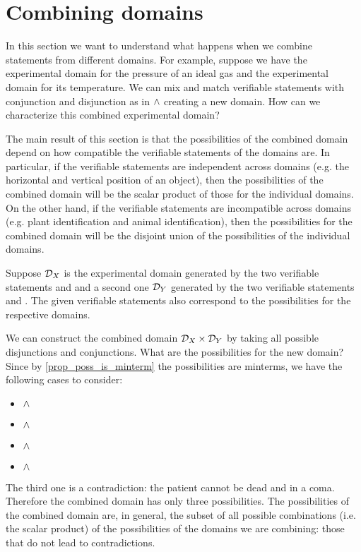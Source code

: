 \documentclass[11pt,letterpaper,fleqn]{memoir} %
\begin{document}
\section{Combining domains}

In this section we want to understand what happens when we combine statements from different domains. For example, suppose we have the experimental domain for the pressure of an ideal gas and the experimental domain for its temperature. We can mix and match verifiable statements with conjunction and disjunction as in $\wedge$ creating a new domain. How can we characterize this combined experimental domain?

The main result of this section is that the possibilities of the combined domain depend on how compatible the verifiable statements of the domains are. In particular, if the verifiable statements are independent across domains (e.g. the horizontal and vertical position of an object), then the possibilities of the combined domain will be the scalar product of those for the individual domains. On the other hand, if the verifiable statements are incompatible across domains (e.g. plant identification and animal identification), then the possibilities for the combined domain will be the disjoint union of the possibilities of the individual domains.

Suppose $\mathcal{D}_X$ is the experimental domain generated by the two verifiable statements  and  and a second one $\mathcal{D}_Y$ generated by the two verifiable statements  and . The given verifiable statements also correspond to the possibilities for the respective domains.

We can construct the combined domain $\mathcal{D}_X \times \mathcal{D}_Y$ by taking all possible disjunctions and conjunctions. What are the possibilities for the new domain? Since by \ref{prop_poss_is_minterm} the possibilities are minterms, we have the following cases to consider:
\begin{itemize}
	\item {} $\wedge$ 
	\item {} $\wedge$ 
	\item {} $\wedge$ 
	\item {} $\wedge$ 
\end{itemize}
The third one is a contradiction: the patient cannot be dead and in a coma. Therefore the combined domain has only three possibilities. The possibilities of the combined domain are, in general, the subset of all possible combinations (i.e. the scalar product) of the possibilities of the domains we are combining: those that do not lead to contradictions.
\end{document}
